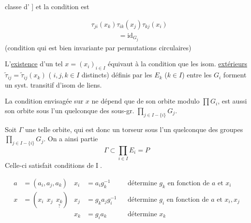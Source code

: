 classe  d' ] et la condition est

\[
\begin{aligned}
&\tau_{ji}(x_k)\tau_{ik}(x_j)\tau_{kj}(x_i)\\
&\hspace{4em}=\mathrm{id}_{G_j}
\end{aligned}
\]
(condition qui est bien invariante par permutations circulaires)

L'\uline{existence} d'un tel $x=(x_i)_{i\in I}$ équivaut à la condition que les isom. \uline{extérieurs} $\widetilde\tau_{ij}=\widetilde\tau_{ij}(x_k)$ ( $i,j,k\in I$ distincts) définis par les $E_k$ ($k\in I$) entre les $G_i$ forment un syst. transitif d'isom de liens.

La condition envisagée sur $x$ ne dépend que de son orbite modulo $\prod G_i$,  est aussi son orbite sous l'un quelconque des sous-gr. $\prod_{j\in I-\{i\}}G_j$.

Soit $\Gamma$ une telle orbite, qui est donc un torseur sous l'un quelconque des  groupes $\prod_{j\in I-\{i\}}G_j$. On a ainsi   partie
\[
\Gamma\subset\prod_{i\in I} E_i=P
\]
Celle-ci satisfait  conditions de \textcircled{I}.

\[
\begin{aligned}
a&=(a_i,a_j,a_k)&x_i&=a_i g_k^{-1}& &\text{détermine }g_k\text{ en fonction de }a\text{ et }x_i\\
x&=(x_i\ \ x_j\ \ \underset{?}{x_k})&x_j&=g_k a_j g_i^{-1}& &\text{détermine }g_i\text{ en fonction de }a\text{ et }x_i,x_j\\
&&x_k&=g_i a_k&&\text{détermine }x_k
\end{aligned}
\]
